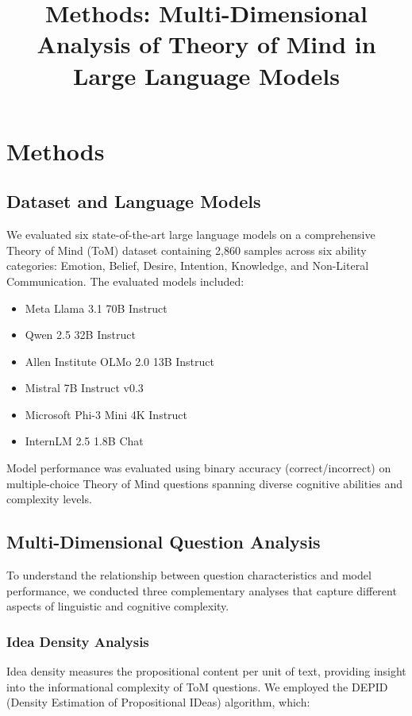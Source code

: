 \documentclass[12pt]{article}
\title{Methods: Multi-Dimensional Analysis of Theory of Mind in Large Language Models}
\author{}
\date{}
\begin{document}
\maketitle

\section{Methods}

\subsection{Dataset and Language Models}

We evaluated six state-of-the-art large language models on a comprehensive Theory of Mind (ToM) dataset containing 2,860 samples across six ability categories: Emotion, Belief, Desire, Intention, Knowledge, and Non-Literal Communication. The evaluated models included:

\begin{itemize}
    \item Meta Llama 3.1 70B Instruct
    \item Qwen 2.5 32B Instruct  
    \item Allen Institute OLMo 2.0 13B Instruct
    \item Mistral 7B Instruct v0.3
    \item Microsoft Phi-3 Mini 4K Instruct
    \item InternLM 2.5 1.8B Chat
\end{itemize}

Model performance was evaluated using binary accuracy (correct/incorrect) on multiple-choice Theory of Mind questions spanning diverse cognitive abilities and complexity levels.

\subsection{Multi-Dimensional Question Analysis}

To understand the relationship between question characteristics and model performance, we conducted three complementary analyses that capture different aspects of linguistic and cognitive complexity.

\subsubsection{Idea Density Analysis}

Idea density measures the propositional content per unit of text, providing insight into the informational complexity of ToM questions. We employed the DEPID (Density Estimation of Propositional IDeas) algorithm, which:
\end{document}
